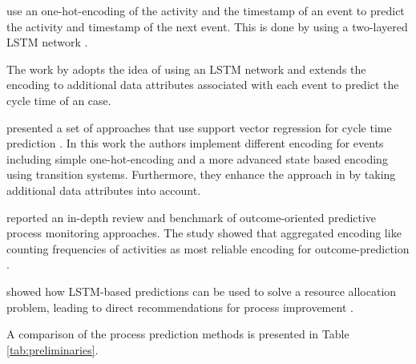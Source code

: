 \citeauthor{DBLP:conf/caise/TaxVRD17} use an one-hot-encoding of the activity and the timestamp of an event to predict the activity and timestamp of the next event.
This is done by using a two-layered LSTM network \cite{DBLP:conf/caise/TaxVRD17}.

The work by \citeauthor{DBLP:conf/ssci/NavarinVPS17} adopts the idea of using an LSTM network \cite{DBLP:conf/caise/TaxVRD17} and extends the encoding to additional data attributes associated with each event \cite{DBLP:conf/ssci/NavarinVPS17} to predict the cycle time of an case.

\citeauthor{DBLP:journals/computing/PolatoSBL18} presented a set of approaches that use support vector regression for cycle time prediction  \cite{DBLP:journals/computing/PolatoSBL18}.
In this work the authors implement different encoding for events including simple one-hot-encoding and a more advanced state based encoding using transition systems.
Furthermore, they enhance the approach in \cite{DBLP:journals/is/AalstSS11} by taking additional data attributes into account.

\citeauthor{DBLP:journals/tkdd/TeinemaaDRM19} reported an in-depth review and benchmark of outcome-oriented predictive process monitoring approaches.
The study showed that aggregated encoding like counting frequencies of activities as most reliable encoding for outcome-prediction \cite{DBLP:journals/tkdd/TeinemaaDRM19}.

\citeauthor{DBLP:conf/icpm/ParkS19} showed how LSTM-based predictions can be used to solve a resource allocation problem, leading to direct recommendations for process improvement \cite{DBLP:conf/icpm/ParkS19}.

A comparison of the process prediction methods is presented in Table \ref{tab:preliminaries}.


